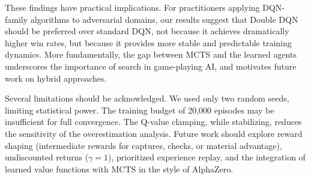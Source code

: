\documentclass[letterpaper]{article}
\begin{document}
These findings have practical implications.
For practitioners applying DQN-family algorithms to adversarial domains, our results suggest that Double DQN should be preferred over standard DQN, not because it achieves dramatically higher win rates, but because it provides more stable and predictable training dynamics.
More fundamentally, the gap between MCTS and the learned agents underscores the importance of search in game-playing AI, and motivates future work on hybrid approaches.

Several limitations should be acknowledged.
We used only two random seeds, limiting statistical power.
The training budget of 20,000 episodes may be insufficient for full convergence.
The Q-value clamping, while stabilizing, reduces the sensitivity of the overestimation analysis.
Future work should explore reward shaping (intermediate rewards for captures, checks, or material advantage), undiscounted returns ($\gamma = 1$), prioritized experience replay, and the integration of learned value functions with MCTS in the style of AlphaZero.




\end{document}
